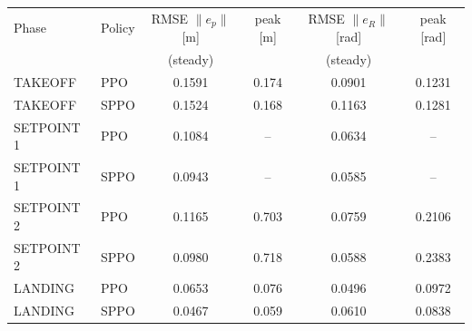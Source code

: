 \begin{tabular}{llcccc}
\toprule
Phase & Policy & RMSE $\|e_p\|$ [m] & peak [m] & RMSE $\|e_R\|$ [rad] & peak [rad] \\
 & & (steady) & & (steady) & \\
\midrule
TAKEOFF & PPO & 0.1591 & 0.174 & 0.0901 & 0.1231 \\
TAKEOFF & SPPO & 0.1524 & 0.168 & 0.1163 & 0.1281 \\
\midrule
SETPOINT 1 & PPO & 0.1084 & -- & 0.0634 & -- \\
SETPOINT 1 & SPPO & 0.0943 & -- & 0.0585 & -- \\
\midrule
SETPOINT 2 & PPO & 0.1165 & 0.703 & 0.0759 & 0.2106 \\
SETPOINT 2 & SPPO & 0.0980 & 0.718 & 0.0588 & 0.2383 \\
\midrule
LANDING & PPO & 0.0653 & 0.076 & 0.0496 & 0.0972 \\
LANDING & SPPO & 0.0467 & 0.059 & 0.0610 & 0.0838 \\
\bottomrule
\end{tabular}

